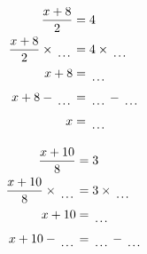 \documentclass[12pt]{article}
\newcounter{minipagecount}
\begin{document}
\begin{multicols}{2}
\begin{minipage}[t]{0.45\textwidth}
    \raggedright %
    \begin{align*} %
        \frac{x + 8}{2} &= 4\\
        \frac{x + 8}{2} \times\dotuline{\hspace{5mm}} &= 4 \times\dotuline{\hspace{5mm}}\\
        x + 8 &= \dotuline{\hspace{5mm}}\\
        x + 8 - \dotuline{\hspace{5mm}} &= \dotuline{\hspace{5mm}} - \dotuline{\hspace{5mm}}\\
        x &= \dotuline{\hspace{5mm}}\\
    \end{align*}
\end{minipage} %
\noindent{(\theminipagecount)}\hspace{0.1mm} %
\begin{minipage}[t]{0.45\textwidth} %
    \vspace{-26pt}  %
    \raggedright %
    \begin{align*} %
        \frac{x + 10}{8} &= 3\\
        \frac{x + 10}{8} \times\dotuline{\hspace{5mm}} &= 3 \times\dotuline{\hspace{5mm}}\\
        x + 10 &= \dotuline{\hspace{5mm}}\\
        x + 10 - \dotuline{\hspace{5mm}} &= \dotuline{\hspace{5mm}} - \dotuline{\hspace{5mm}}\\

\end{align*}
\end{minipage}
\end{multicols}
\end{document}
